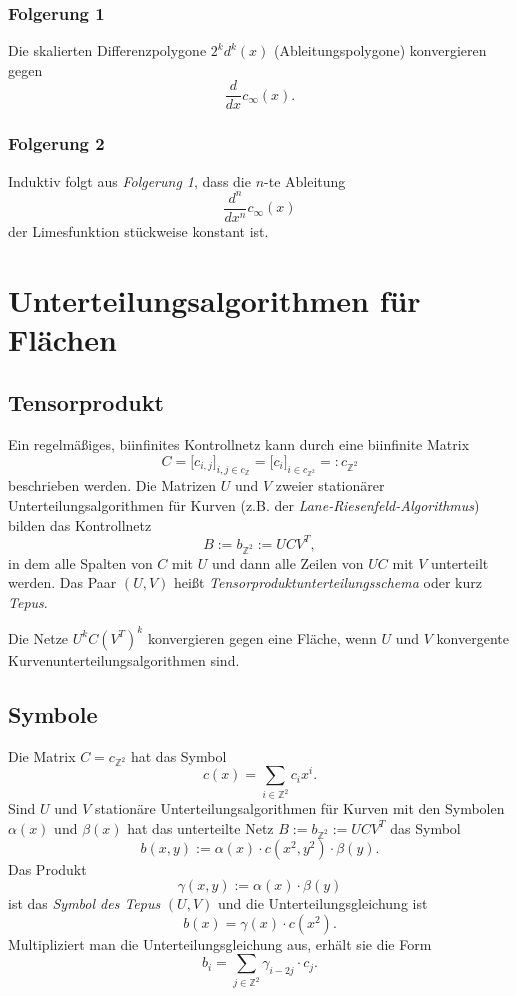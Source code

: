 \subsubsection{Folgerung 1}
Die skalierten Differenzpolygone \(2^k d^k(x)\) (Ableitungspolygone) konvergieren gegen
\[\frac{d}{dx} c_{\infty}(x).\]

\subsubsection{Folgerung 2}
Induktiv folgt aus \textit{Folgerung 1}, dass die \(n\)-te Ableitung
\[\frac{d^n}{dx^n} c_{\infty}(x)\]
der Limesfunktion stückweise konstant ist.



\section{Unterteilungsalgorithmen für Flächen}

\subsection{Tensorprodukt}
Ein regelmäßiges, biinfinites Kontrollnetz kann durch eine biinfinite Matrix
\[C = \lbrack c_{i,j} \rbrack_{i,j \in c_{\mathbb{Z}}} = \lbrack c_i \rbrack_{i \in c_{\mathbb{Z}^2}} =: c_{\mathbb{Z}^2}\]
beschrieben werden. Die Matrizen \(U\) und \(V\) zweier stationärer Unterteilungsalgorithmen für Kurven (z.B. der \textit{Lane-Riesenfeld-Algorithmus}) bilden das Kontrollnetz
\[B := b_{\mathbb{Z}^2} := UCV^T,\]
in dem alle Spalten von \(C\) mit \(U\) und dann alle Zeilen von \(UC\) mit \(V\) unterteilt werden. Das Paar \((U,V)\) heißt \textit{Tensorproduktunterteilungsschema} oder kurz \textit{Tepus}.

Die Netze \(U^kC(V^T)^k\) konvergieren gegen eine Fläche, wenn \(U\) und \(V\) konvergente Kurvenunterteilungsalgorithmen sind.


\subsection{Symbole}
Die Matrix \(C=c_{\mathbb{Z}^2}\) hat das Symbol
\[c(x) = \sum_{i \in \mathbb{Z}^2} c_i x^i.\]
Sind \(U\) und \(V\) stationäre Unterteilungsalgorithmen für Kurven mit den Symbolen \(\alpha(x)\) und \(\beta(x)\) hat das unterteilte Netz \(B := b_{\mathbb{Z}^2} := UCV^T\)
das Symbol
\[b(x,y) := \alpha(x) \cdot c(x^2,y^2) \cdot \beta(y).\]
Das Produkt
\[\gamma(x,y) := \alpha(x) \cdot \beta(y)\]
ist das \textit{Symbol des Tepus} \((U,V)\) und die Unterteilungsgleichung ist
\[b(x) = \gamma(x) \cdot c(x^2).\]
Multipliziert man die Unterteilungsgleichung aus, erhält sie die Form
\[b_i = \sum_{j \in \mathbb{Z}^2} \gamma_{i-2j} \cdot c_j.\]

